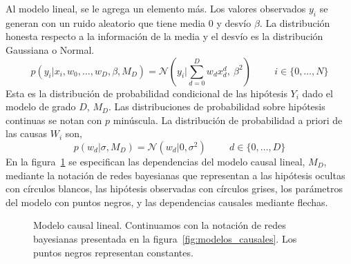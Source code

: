 \documentclass[a4paper,11pt]{book}
\newcommand{\N}{\mathcal{N}}
\theoremstyle{definition}
\begin{document}
Al modelo lineal, se le agrega un elemento m\'as.
%
Los valores observados $y_i$ se generan con un ruido aleatorio que tiene media 0 y desv\'io $\beta$.
%
La distribuci\'on honesta respecto a la informaci\'on de la media y el desv\'io es la distribuci\'on Gaussiana o Normal.
%
\begin{equation} \label{eq:likelihood_modelo_lineal}
p(y_i|x_i, w_0, \dots, w_D, \beta, M_D) = \N(y_i| \sum_{d = 0}^{D} w_d x_d^d,\ \beta^2) \hspace{1cm} \text{$i \in \{0,\dots, N\}$}
\end{equation}
%
Esta es la distribuci\'on de probabilidad condicional de las hip\'otesis $Y_i$ dado el modelo de grado $D$, $M_D$.
%
Las distribuciones de probabilidad sobre hip\'otesis continuas se notan con $p$ min\'uscula.
%
La distribuci\'on de probabilidad a priori de las causas $W_i$ son,
%
\begin{equation} \label{eq:prior_modelo_lineal}
p(w_d|\sigma,M_D) = \N(w_d|0, \sigma^2) \hspace{1cm} \text{$d \in \{0,\dots,D\}$}
\end{equation}
%
En la figura~\ref{fig:modelo_lineal} se especifican las dependencias del modelo causal lineal, $M_D$, mediante la notaci\'on de redes bayesianas que representan a las hip\'otesis ocultas con c\'irculos blancos, las hip\'otesis observadas con c\'irculos grises, los par\'ametros del modelo con puntos negros, y las dependencias causales mediante flechas.
%
\begin{figure}[ht!]
    \centering
    \begin{subfigure}[c]{0.45\textwidth}
    \centering
    \end{subfigure}
    \caption{Modelo causal lineal. Continuamos con la notaci\'on de redes bayesianas presentada en la figura~\ref{fig:modelos_causales}. Los puntos negros representan constantes.}
    \label{fig:modelo_lineal}
\end{figure}
\end{document}
